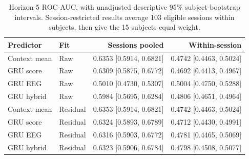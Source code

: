 \begin{table}[!ht]
\centering
\small
\setlength{\tabcolsep}{5pt}
\renewcommand{\arraystretch}{1.1}
\caption{Horizon-5 ROC-AUC, with unadjusted descriptive 95\% subject-bootstrap intervals. Session-restricted results average 103 eligible sessions within subjects, then give the 15 subjects equal weight.}
\label{tab:supp_ranking}
\begin{tabular}{llrr}
\toprule
Predictor & Fit & Sessions pooled & Within-session \\
\midrule
Context mean & Raw & 0.6353 [0.5914, 0.6821] & 0.4742 [0.4463, 0.5024] \\
GRU score & Raw & 0.6309 [0.5875, 0.6772] & 0.4692 [0.4413, 0.4967] \\
GRU EEG & Raw & 0.5010 [0.4730, 0.5307] & 0.5004 [0.4750, 0.5288] \\
GRU hybrid & Raw & 0.5984 [0.5695, 0.6284] & 0.4806 [0.4651, 0.4964] \\
Context mean & Residual & 0.6353 [0.5914, 0.6821] & 0.4742 [0.4463, 0.5024] \\
GRU score & Residual & 0.6324 [0.5893, 0.6789] & 0.4712 [0.4430, 0.4991] \\
GRU EEG & Residual & 0.6316 [0.5903, 0.6772] & 0.4781 [0.4465, 0.5069] \\
GRU hybrid & Residual & 0.6323 [0.5906, 0.6784] & 0.4798 [0.4508, 0.5077] \\
\bottomrule
\end{tabular}
\end{table}
